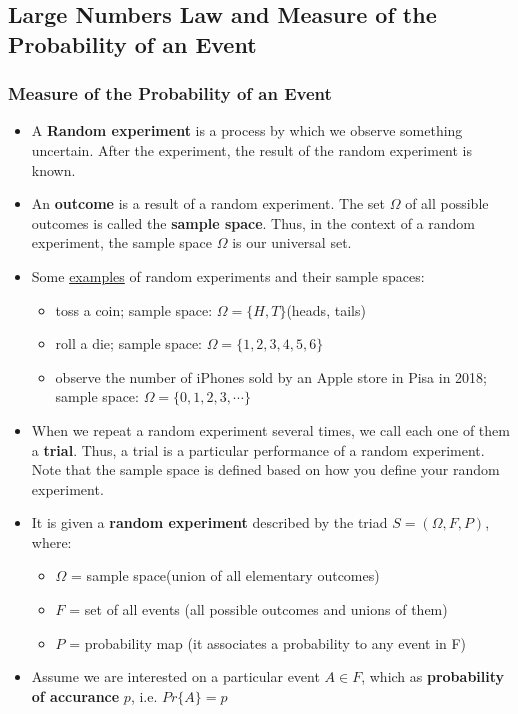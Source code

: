 \subsection{Large Numbers Law and Measure of the Probability of an Event}
\subsubsection{Measure of the Probability of an Event}
\begin{itemize}
    \item A \textbf{Random experiment} is a process by which we observe something uncertain. After the experiment, the result of the random experiment is known.
    \item An \textbf{outcome} is a result of a random experiment. The set \(\Omega\) of all possible outcomes is called the \textbf{sample space}. Thus, in the context of a random experiment, the sample space \(\Omega\) is our universal set.
    \item Some \underline{examples} of random experiments and their sample spaces:
    \begin{itemize}
        \item toss a coin; sample space: \(\Omega=\{H,T\}\)(heads, tails)
        \item roll a die; sample space: \(\Omega=\{1,2,3,4,5,6\}\)
        \item observe the number of iPhones sold by an Apple store in Pisa in 2018; sample space: \(\Omega=\{0,1,2,3,\cdots\}\)
    \end{itemize}
    \item When we repeat a random experiment several times, we call each one of them a \textbf{trial}. Thus, a trial is a particular performance of a random experiment. Note that the sample space is defined based on how you define your random experiment.
    \item It is given a \textbf{random experiment} described by the triad \(S=(\Omega,F,P)\), where:
        \begin{itemize}
            \item \(\Omega \) = sample space(union of all elementary outcomes)
            \item \(F\) = set of all events (all possible outcomes and unions of them)
            \item \(P\) = probability map (it associates a probability to any event in F)
        \end{itemize}
    \item Assume we are interested on a particular event \(A\in F\), which as \textbf{probability of accurance} \(p\), i.e. \(Pr\{A\}=p\)

\end{itemize}
